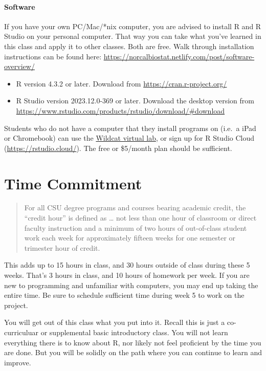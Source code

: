 \documentclass[
  11pt,
]{article}
\providecommand{\tightlist}{%
  \setlength{\itemsep}{0pt}\setlength{\parskip}{0pt}}
\begin{document}
\paragraph{Software}\label{software}

If you have your own PC/Mac/*nix computer, you are advised to install R
and R Studio on your personal computer. That way you can take what
you've learned in this class and apply it to other classes. Both are
free. Walk through installation instructions can be found here:
\url{https://norcalbiostat.netlify.com/post/software-overview/}

\begin{itemize}
\tightlist
\item
  R version 4.3.2 or later. Download from
  \url{https://cran.r-project.org/}
\item
  R Studio version 2023.12.0-369 or later. Download the desktop version
  from
  \url{https://www.rstudio.com/products/rstudio/download/\#download}
\end{itemize}

Students who do not have a computer that they install programs on
(i.e.~a iPad or Chromebook) can use the
\href{https://support.csuchico.edu/TDClient/1984/Portal/KB/ArticleDet?ID=112333}{Wildcat
virtual lab}, or sign up for R Studio Cloud
(\url{https://rstudio.cloud/}). The free or \$5/month plan should be
sufficient.

\section{Time Commitment}\label{time-commitment}

\begin{quote}
For all CSU degree programs and courses bearing academic credit, the
``credit hour'' is defined as \ldots{} not less than one hour of
classroom or direct faculty instruction and a minimum of two hours of
out-of-class student work each week for approximately fifteen weeks for
one semester or trimester hour of credit.
\end{quote}

This adds up to 15 hours in class, and 30 hours outside of class during
these 5 weeks. That's 3 hours in class, and 10 hours of homework per
week. If you are new to programming and unfamiliar with computers, you
may end up taking the entire time. Be sure to schedule sufficient time
during week 5 to work on the project.

You will get out of this class what you put into it. Recall this is just
a co-curriculuar or supplemental basic introductory class. You will not
learn everything there is to know about R, nor likely not feel
proficient by the time you are done. But you will be solidly on the path
where you can continue to learn and improve.
\end{document}
